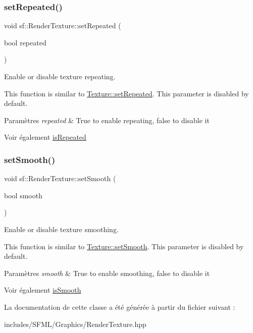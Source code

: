 \subsubsection{\texorpdfstring{set\+Repeated()}{setRepeated()}}
{\footnotesize\ttfamily void sf\+::\+Render\+Texture\+::set\+Repeated (\begin{DoxyParamCaption}\item[{bool}]{repeated }\end{DoxyParamCaption})}



Enable or disable texture repeating. 

This function is similar to \hyperlink{classsf_1_1Texture_aaa87d1eff053b9d4d34a24c784a28658}{Texture\+::set\+Repeated}. This parameter is disabled by default.


\begin{DoxyParams}{Paramètres}
{\em repeated} & True to enable repeating, false to disable it\\
\hline
\end{DoxyParams}
\begin{DoxySeeAlso}{Voir également}
\hyperlink{classsf_1_1RenderTexture_a81c5a453a21c7e78299b062b97dc8c87}{is\+Repeated} 
\end{DoxySeeAlso}
\mbox{\label{classsf_1_1RenderTexture_af08991e63c6020865dd07b20e27305b6}} 
\subsubsection{\texorpdfstring{set\+Smooth()}{setSmooth()}}
{\footnotesize\ttfamily void sf\+::\+Render\+Texture\+::set\+Smooth (\begin{DoxyParamCaption}\item[{bool}]{smooth }\end{DoxyParamCaption})}



Enable or disable texture smoothing. 

This function is similar to \hyperlink{classsf_1_1Texture_a0c3bd6825b9a99714f10d44179d74324}{Texture\+::set\+Smooth}. This parameter is disabled by default.


\begin{DoxyParams}{Paramètres}
{\em smooth} & True to enable smoothing, false to disable it\\
\hline
\end{DoxyParams}
\begin{DoxySeeAlso}{Voir également}
\hyperlink{classsf_1_1RenderTexture_a5b43c007ab6643accc5dae84b5bc8f61}{is\+Smooth} 
\end{DoxySeeAlso}


La documentation de cette classe a été générée à partir du fichier suivant \+:\begin{DoxyCompactItemize}
\item 
includes/\+S\+F\+M\+L/\+Graphics/Render\+Texture.\+hpp\end{DoxyCompactItemize}
